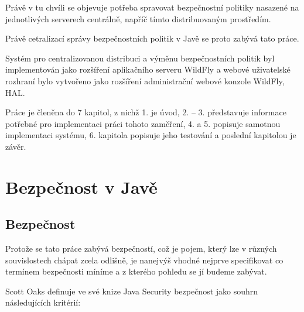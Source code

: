 Právě v tu chvíli se objevuje potřeba spravovat bezpečnostní politiky nasazené na jednotlivých serverech centrálně, napříč tímto distribuovaným prostředím.

Právě cetralizací správy bezpečnostních politik v Javě se proto zabývá tato práce.

Systém pro centralizovanou distribuci a výměnu bezpečnostních politik byl implementován jako rozšíření aplikačního serveru
WildFly a webové uživatelské rozhraní bylo vytvořeno jako rozšíření administrační webové konzole WildFly, HAL.

Práce je členěna do 7 kapitol, z nichž 1. je úvod, 2. -- 3. představuje informace potřebné pro implementaci práci tohoto zaměření,
4. a 5. popisuje samotnou implementaci systému, 6. kapitola popisuje jeho testování a poslední kapitolou je závěr.

\chapter{Bezpečnost v Javě} \label{teoretickyUvod}

\section{Bezpečnost}

Protože se tato práce zabývá bezpečností, což je pojem, který lze v různých souvislostech chápat zcela odlišně, je nanejvýš vhodné nejprve specifikovat co termínem bezpečnosti míníme a z kterého pohledu se jí budeme zabývat.

Scott Oaks definuje ve své knize Java Security bezpečnost jako souhrn následujících kritérií: \cite[1.1]{oaks}

